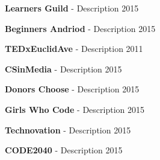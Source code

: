 \documentclass[11pt,article,oneside]{memoir}
\begin{document}
\ind \textbf{Learners Guild} - Description \hfill 2015

\ind \textbf{Beginners Andriod} - Description \hfill 2015

\bigskip


\ind \textbf{TEDxEuclidAve} - Description \hfill 2011

\ind \textbf{CSinMedia} - Description \hfill 2015

\ind \textbf{Donors Choose} - Description \hfill 2015

\ind \textbf{Girls Who Code} - Description \hfill 2015

\ind \textbf{Technovation} - Description \hfill 2015

\ind \textbf{CODE2040} - Description \hfill 2015

\bigskip
\end{document}
